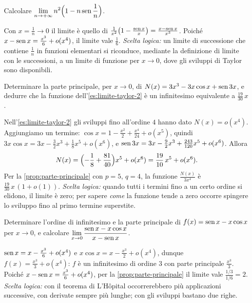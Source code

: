 \begin{esercizio}
Calcolare $\displaystyle\lim_{n\to+\infty}n^{2}\Bigl(1-n\operatorname{sen}\frac1n\Bigr)$.
\begin{soluzione}
Con $x=\frac1n\to0$ il limite è quello di $\frac{1}{x^{2}}\bigl(1-\frac{\operatorname{sen} x}x\bigr)=\frac{x-\operatorname{sen} x}{x^{3}}$. Poiché
$x-\operatorname{sen} x=\frac{x^{3}}6+o(x^{4})$, il limite vale $\frac16$. \emph{Scelta logica:} un limite di
successione che contiene $\frac1n$ in funzioni elementari si riconduce, mediante la
definizione di limite con le successioni, a un limite di funzione per $x\to0$, dove gli
sviluppi di Taylor sono disponibili.
\end{soluzione}
\end{esercizio}

\begin{esercizio}\label{es:verifica-19-30}
Determinare la parte principale, per $x\to0$, di $N(x)=3x^{3}-3x\cos x+\operatorname{sen}3x$, e
dedurre che la funzione dell'\cref{es:limite-taylor-2} è un infinitesimo equivalente a
$\frac{19}{30}\,x$.
\begin{soluzione}
Nell'\cref{es:limite-taylor-2} gli sviluppi fino all'ordine $4$ hanno dato $N(x)=o(x^{4})$.
Aggiungiamo un termine: $\cos x=1-\frac{x^{2}}2+\frac{x^{4}}{24}+o(x^{5})$, quindi
$3x\cos x=3x-\frac32x^{3}+\frac18x^{5}+o(x^{6})$, e
$\operatorname{sen}3x=3x-\frac92x^{3}+\frac{243}{120}x^{5}+o(x^{6})$. Allora
\[
  N(x)=\Bigl(-\frac18+\frac{81}{40}\Bigr)x^{5}+o(x^{6})=\frac{19}{10}\,x^{5}+o(x^{6}) .
\]
Per la \cref{prop:parte-principale} con $p=5$, $q=4$, la funzione $\frac{N(x)}{3x^{4}}$ è
$\frac{19}{30}\,x\,(1+o(1))$. \emph{Scelta logica:} quando tutti i termini fino a un certo ordine si
elidono, il limite è zero; per sapere \emph{come} la funzione tende a zero occorre
spingere lo sviluppo fino al primo termine superstite.
\end{soluzione}
\end{esercizio}

\begin{esercizio}
Determinare l'ordine di infinitesimo e la parte principale di $f(x)=\operatorname{sen} x-x\cos x$ per
$x\to0$, e calcolare $\displaystyle\lim_{x\to0}\frac{\operatorname{sen} x-x\cos x}{x-\operatorname{sen} x}$.
\begin{soluzione}
$\operatorname{sen} x=x-\frac{x^{3}}6+o(x^{4})$ e $x\cos x=x-\frac{x^{3}}2+o(x^{4})$, dunque
$f(x)=\frac{x^{3}}3+o(x^{4})$: $f$ è un infinitesimo di ordine $3$ con parte principale $\frac{x^{3}}3$.
Poiché $x-\operatorname{sen} x=\frac{x^{3}}6+o(x^{4})$, per la \cref{prop:parte-principale} il limite vale
$\frac{1/3}{1/6}=2$. \emph{Scelta logica:} con il teorema di L'Hôpital occorrerebbero più
applicazioni successive, con derivate sempre più lunghe; con gli sviluppi bastano due
righe.
\end{soluzione}
\end{esercizio}


